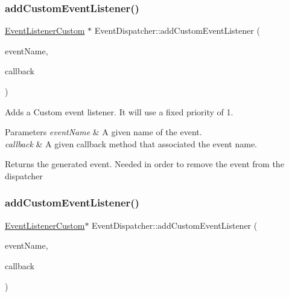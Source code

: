 \subsubsection{\texorpdfstring{add\+Custom\+Event\+Listener()}{addCustomEventListener()}\hspace{0.1cm}{\footnotesize\ttfamily [1/2]}}
{\footnotesize\ttfamily \hyperlink{classEventListenerCustom}{Event\+Listener\+Custom} $\ast$ Event\+Dispatcher\+::add\+Custom\+Event\+Listener (\begin{DoxyParamCaption}\item[{const std\+::string \&}]{event\+Name,  }\item[{const std\+::function$<$ void(\hyperlink{classEventCustom}{Event\+Custom} $\ast$)$>$ \&}]{callback }\end{DoxyParamCaption})}

Adds a Custom event listener. It will use a fixed priority of 1. 
\begin{DoxyParams}{Parameters}
{\em event\+Name} & A given name of the event. \\
\hline
{\em callback} & A given callback method that associated the event name. \\
\hline
\end{DoxyParams}
\begin{DoxyReturn}{Returns}
the generated event. Needed in order to remove the event from the dispatcher 
\end{DoxyReturn}
\mbox{\label{classEventDispatcher_a7f5fe2c96f5072f1666db7be277aca73}} 
\subsubsection{\texorpdfstring{add\+Custom\+Event\+Listener()}{addCustomEventListener()}\hspace{0.1cm}{\footnotesize\ttfamily [2/2]}}
{\footnotesize\ttfamily \hyperlink{classEventListenerCustom}{Event\+Listener\+Custom}$\ast$ Event\+Dispatcher\+::add\+Custom\+Event\+Listener (\begin{DoxyParamCaption}\item[{const std\+::string \&}]{event\+Name,  }\item[{const std\+::function$<$ void(\hyperlink{classEventCustom}{Event\+Custom} $\ast$)$>$ \&}]{callback }\end{DoxyParamCaption})}

